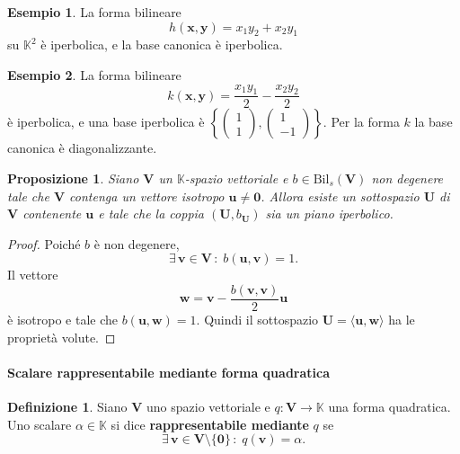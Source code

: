 \documentclass{article}
\theoremstyle{plain}
\newtheorem{prop}[thm]{Proposizione}
\theoremstyle{definition}
\newtheorem{defn}{Definizione}[section]
\newtheorem{exmp}{Esempio}[section]
\theoremstyle{remark}
\begin{document}
\vspace{10pt}

\begin{exmp}
La forma bilineare
\[h(\mathbf{x}, \mathbf{y}) = x_1 y_2 + x_2 y_1\]
su $\mathbb{K}^2$ è iperbolica, e la base canonica è iperbolica.    
\end{exmp}

\vspace{10pt}

\begin{exmp}
La forma bilineare
\[k(\mathbf{x}, \mathbf{y}) = \dfrac{x_1 y_1}{2}  - \dfrac{x_2 y_2}{2} \]
è iperbolica, e una base iperbolica è $\left\{\begin{pmatrix}1\\1\end{pmatrix}, \begin{pmatrix}1\\-1\end{pmatrix}\right\}$. 
Per la forma $k$ la base canonica è diagonalizzante.    
\end{exmp}

\vspace{10pt}

\begin{bxthm}
\begin{prop}
Siano $\mathbf{V}$ un $\mathbb{K}$-spazio vettoriale e $b\in\mathrm{Bil}_s(\mathbf{V})$
non degenere tale che $\mathbf{V}$ contenga un vettore isotropo $\mathbf{u} \neq \mathbf{0}$. 
Allora esiste un sottospazio $\mathbf{U}$ di $\mathbf{V}$ contenente $\mathbf{u}$ e tale che la 
coppia $(\mathbf{U}, b_{\mathbf{U}})$ sia un piano iperbolico.    
\end{prop}
\end{bxthm}
\begin{proof}
Poiché $b$ è non degenere, 
\[\exists\,\mathbf{v} \in \mathbf{V}\,:\;b(\mathbf{u}, \mathbf{v}) = 1.\]
Il vettore
\[\mathbf{w} = \mathbf{v} - \frac{b(\mathbf{v}, \mathbf{v})}{2} \mathbf{u}\]
è isotropo e tale che $b(\mathbf{u}, \mathbf{w}) = 1$. Quindi il sottospazio 
$\mathbf{U} = \langle \mathbf{u}, \mathbf{w} \rangle$ ha le proprietà volute.    
\end{proof}

\vspace{10pt}

\paragraph{Scalare rappresentabile mediante forma quadratica}
\begin{bxthm}
\begin{defn}
Siano $\mathbf{V}$ uno spazio vettoriale e $q: \mathbf{V} \to \mathbb{K}$ una forma quadratica. 
Uno scalare $\alpha \in \mathbb{K}$ si dice \textbf{rappresentabile mediante} $q$ se 
\[\exists\,\mathbf{v} \in \mathbf{V}\setminus\{\mathbf{0}\}\,:\;q(\mathbf{v}) = \alpha.\]
\end{defn}
\end{bxthm}
\end{document}
